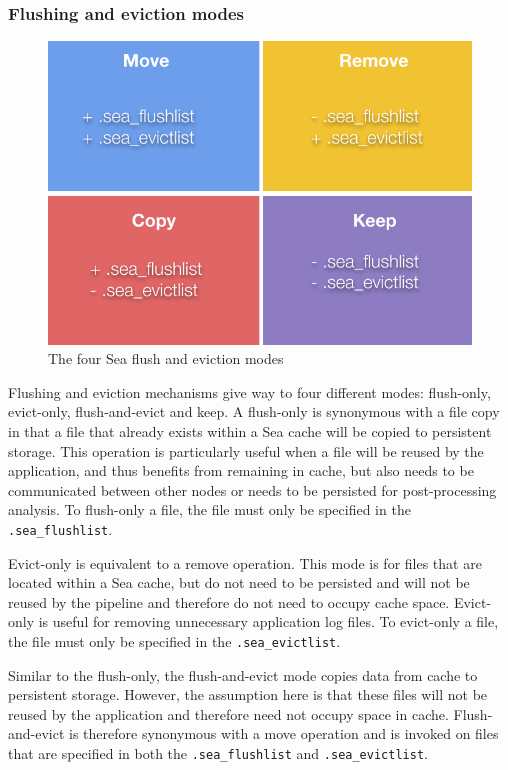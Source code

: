 \documentclass[10pt,journal,compsoc]{IEEEtran}
\newcommand{\todo}[1]{\marginpar{\parbox{18mm}{\flushleft\tiny\color{red}\textbf{TODO}:
#1}}}
\begin{document}
\subsubsection{Flushing and eviction modes}
\begin{figure}

    \centering
    \includegraphics[scale=0.8]{figures/sea-flushevict.pdf}%
\caption{The four Sea flush and eviction modes }
\label{fig:sea-comp:fe}
\end{figure}
Flushing and eviction mechanisms give way to four different modes: flush-only,
evict-only, flush-and-evict and keep. A flush-only is synonymous with a file
copy in that a file that already exists within a Sea cache will be copied to
persistent storage. This operation is particularly useful when a file will be
reused by the application, and thus benefits from remaining in cache, but also
needs to be communicated between other nodes or needs to be persisted for
post-processing analysis. To flush-only a file, the file must only be specified
in the \texttt{.sea\_flushlist}.

Evict-only is equivalent to a remove operation. This mode is for files that are
located within a Sea cache, but do not need to be persisted and will not be
reused by the pipeline and therefore do not need to occupy cache space.
Evict-only is useful for removing unnecessary application log files. To
evict-only a file, the file must only be specified in the
\texttt{.sea\_evictlist}.

Similar to the flush-only, the flush-and-evict mode copies data from cache to
persistent storage. However, the assumption here is that these files will not be
reused by the application and therefore need not occupy space in cache.
Flush-and-evict is therefore synonymous with a move operation and is invoked on
files that are specified in both the \texttt{.sea\_flushlist} and
\texttt{.sea\_evictlist}.
\end{document}
